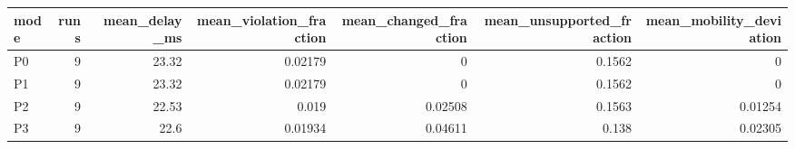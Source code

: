\begin{tabular}{lrrrrrr}
\toprule
mode & runs & mean_delay_ms & mean_violation_fraction & mean_changed_fraction & mean_unsupported_fraction & mean_mobility_deviation \\
\midrule
P0 & 9 & 23.32 & 0.02179 & 0 & 0.1562 & 0 \\
P1 & 9 & 23.32 & 0.02179 & 0 & 0.1562 & 0 \\
P2 & 9 & 22.53 & 0.019 & 0.02508 & 0.1563 & 0.01254 \\
P3 & 9 & 22.6 & 0.01934 & 0.04611 & 0.138 & 0.02305 \\
\bottomrule
\end{tabular}
